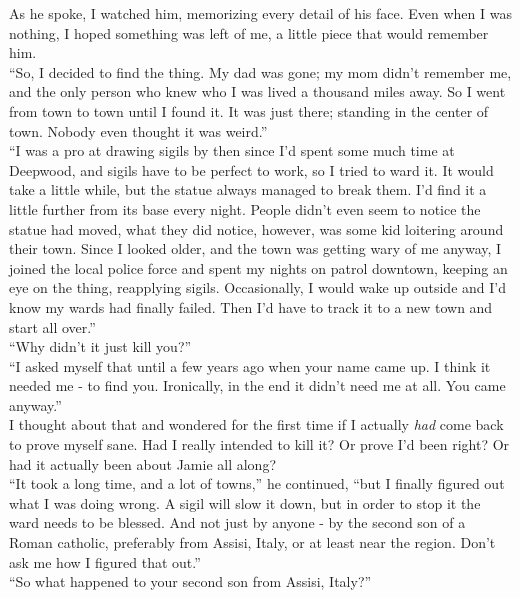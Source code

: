 \documentclass[a5paper]{scrartcl}
\begin{document}
As he spoke, I watched him, memorizing every detail of his face. Even when I was nothing, I hoped something was left of me, a little piece that would remember him.\\


\enquote{So, I decided to find the thing. My dad was gone; my mom didn't remember me, and the only person who knew who I was lived a thousand miles away. So I went from town to town until I found it. It was just there; standing in the center of town. Nobody even thought it was weird.}\\


\enquote{I was a pro at drawing sigils by then since I'd spent some much time at Deepwood, and sigils have to be perfect to work, so I tried to ward it. It would take a little while, but the statue always managed to break them. I'd find it a little further from its base every night. People didn't even seem to notice the statue had moved, what they did notice, however, was some kid loitering around their town.  Since I looked older, and the town was getting wary of me anyway, I joined the local police force and spent my nights on patrol downtown, keeping an eye on the thing, reapplying sigils. Occasionally, I would wake up outside and I'd know my wards had finally failed. Then I'd have to track it to a new town and start all over.}\\


\enquote{Why didn't it just kill you?}\\


\enquote{I asked myself that until a few years ago when your name came up. I think it needed me - to find you. Ironically, in the end it didn't need me at all. You came anyway.}\\


I thought about that and wondered for the first time if I actually \textit{had}
 come back to prove myself sane. Had I really intended to kill it? Or prove I'd been right? Or had it actually been about Jamie all along?\\


\enquote{It took a long time, and a lot of towns,} he continued, \enquote{but I finally figured out what I was doing wrong. A sigil will slow it down, but in order to stop it the ward needs to be blessed. And not just by anyone - by the second son of a Roman catholic, preferably from Assisi, Italy, or at least near the region. Don't ask me how I figured that out.}\\


\enquote{So what happened to your second son from Assisi, Italy?}\\
\end{document}
